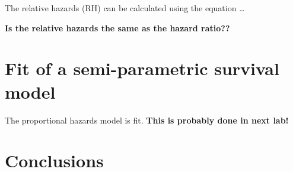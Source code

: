 \documentclass[
]{article}
\begin{document}
The relative hazards (RH) can be calculated using the equation \ldots{}

\textbf{Is the relative hazards the same as the hazard ratio??}

\hypertarget{fit-of-a-semi-parametric-survival-model}{%
\section{Fit of a semi-parametric survival model}\label{fit-of-a-semi-parametric-survival-model}}

The proportional hazards model is fit. \textbf{This is probably done in next lab!}

\hypertarget{conclusions}{%
\section{Conclusions}\label{conclusions}}
\end{document}
